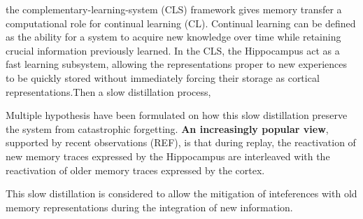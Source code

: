 \documentclass[10pt,letterpaper]{article}
\theoremstyle{plain}
\theoremstyle{remark}
\begin{document}
the complementary-learning-system (CLS) framework gives memory transfer a computational role for continual learning (CL). Continual learning can be defined as the ability for a system to acquire new knowledge over time while retaining crucial information previously learned. 
In the CLS, the Hippocampus act as a fast learning subsystem, allowing the representations proper to new experiences to be quickly stored without immediately forcing their storage as cortical representations.Then a slow distillation process, 


Multiple hypothesis have been formulated on how this slow distillation preserve the system from catastrophic forgetting. \textbf{An increasingly popular view}, supported by recent observations (REF), is that during replay, the reactivation of new memory traces expressed by the Hippocampus are interleaved with the reactivation of older memory traces expressed by the cortex.


This slow distillation is considered to allow the mitigation of inteferences with old memory representations during the integration of new information.


\end{document}
